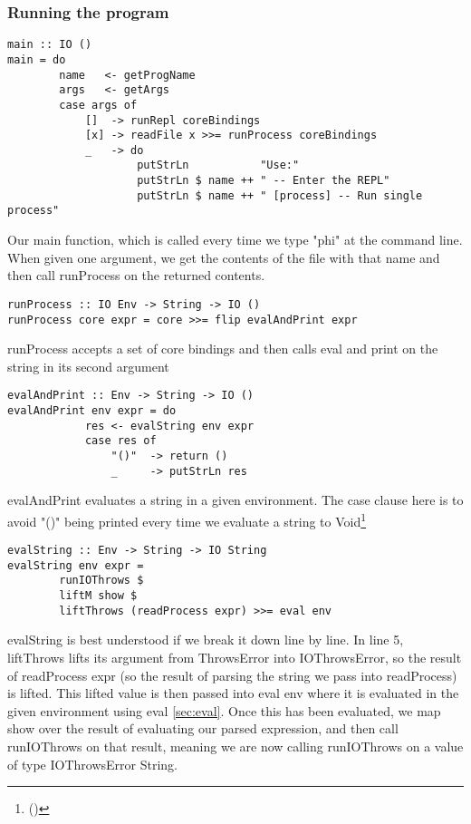\subsubsection{Running the program}
\begin{verbatim}
main :: IO ()
main = do
        name   <- getProgName
        args   <- getArgs
        case args of
            []  -> runRepl coreBindings
            [x] -> readFile x >>= runProcess coreBindings 
            _   -> do
                    putStrLn           "Use:"
                    putStrLn $ name ++ " -- Enter the REPL"
                    putStrLn $ name ++ " [process] -- Run single process"
\end{verbatim}

Our main function, which is called every time we type "phi" at the command line. When given one argument, we get the contents of the file with that name and then call runProcess on the returned contents.

\begin{verbatim}
runProcess :: IO Env -> String -> IO ()
runProcess core expr = core >>= flip evalAndPrint expr
\end{verbatim}

runProcess accepts a set of core bindings and then calls eval and print on the string in its second argument

\begin{verbatim}
evalAndPrint :: Env -> String -> IO ()
evalAndPrint env expr = do
            res <- evalString env expr 
            case res of
                "()"  -> return ()
                _     -> putStrLn res
\end{verbatim}

evalAndPrint evaluates a string in a given environment. The case clause here is to avoid "()" being printed every time we evaluate a string to Void\footnote{()}

\begin{verbatim}
evalString :: Env -> String -> IO String
evalString env expr = 
        runIOThrows $
        liftM show $ 
        liftThrows (readProcess expr) >>= eval env
\end{verbatim}
evalString is best understood if we break it down line by line. In line 5,  liftThrows lifts its argument from ThrowsError into IOThrowsError, so the result of readProcess expr (so the result of parsing the string we pass into readProcess) is lifted. This lifted value is then passed into eval env where it is evaluated in the given environment using eval \ref{sec:eval}.
Once this has been evaluated, we map show over the result of evaluating our parsed expression, and then call runIOThrows on that result, meaning we are now calling runIOThrows on a value of type IOThrowsError String.

